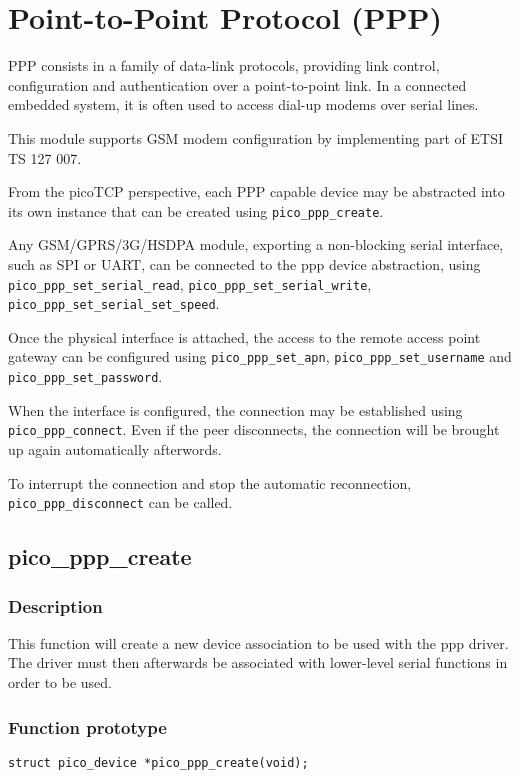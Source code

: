 \section{Point-to-Point Protocol (PPP)}

PPP consists in a family of data-link protocols, providing link control, 
configuration and authentication over a point-to-point link. In a connected
embedded system, it is often used to access dial-up modems over serial lines.

This module supports GSM modem configuration by implementing part of ETSI TS 127 007.

From the picoTCP perspective, each PPP capable device may be abstracted into its own instance 
that can be created using \texttt{pico\_ppp\_create}.

Any GSM/GPRS/3G/HSDPA module, exporting a non-blocking serial interface, such as SPI or UART,
can be connected to the ppp device abstraction, using \texttt{pico\_ppp\_set\_serial\_read}, 
\texttt{pico\_ppp\_set\_serial\_write}, \texttt{pico\_ppp\_set\_serial\_set\_speed}.

Once the physical interface is attached, the access to the remote access point gateway
can be configured using \texttt{pico\_ppp\_set\_apn},   \texttt{pico\_ppp\_set\_username} and
\texttt{pico\_ppp\_set\_password}.

When the interface is configured, the connection may be established using
\texttt{pico\_ppp\_connect}. Even if the peer disconnects, the connection will be brought up 
again automatically afterwords.

To interrupt the connection and stop the automatic reconnection, \texttt{pico\_ppp\_disconnect}
can be called.

\subsection{pico\_ppp\_create}

\subsubsection*{Description}
This function will create a new device association to be used with the ppp driver. The driver
must then afterwards be associated with lower-level serial functions in order to be used.

\subsubsection*{Function prototype}
\texttt{struct pico\_device *pico\_ppp\_create(void);}


